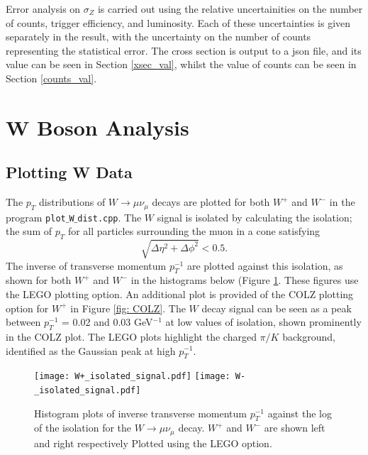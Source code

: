 \documentclass[a4paper]{article}
\begin{document}
Error analysis on $\sigma_Z$ is carried out using the relative uncertainities on the number of counts, trigger efficiency, and luminosity. Each of these uncertainties is given separately in the result, with the uncertainty on the number of counts representing the statistical error. The cross section is output to a json file, and its value can be seen in Section \ref{xsec_val}, whilst the value of counts can be seen in Section \ref{counts_val}.


\section{W Boson Analysis} \label{sec: W boson}

\subsection{Plotting W Data} \label{sec: W plotting}

The $p_T$ distributions of $W \xrightarrow{} \mu \nu_\mu$ decays are plotted for both $W^+$ and $W^-$ in the program \texttt{plot$\_$W$\_$dist.cpp}. 
The $W$ signal is isolated by calculating the isolation; the sum of $p_T$ for all particles surrounding the muon in a cone satisfying
\begin{equation}
    \sqrt{\Delta\eta^2 + \Delta\phi^2} < 0.5.
    \label{eq: isolation}
\end{equation}
The inverse of transverse momentum $p_T^{-1}$ are plotted against this isolation, as shown for both $W^+$ and $W^-$ in the histograms below (Figure \ref{fig: LEGO}. These figures use the LEGO plotting option. An additional plot is provided of the COLZ plotting option for $W^+$ in Figure \ref{fig: COLZ}. %
The $W$ decay signal can be seen as a peak between $p_T^{-1}$ = 0.02 and 0.03 GeV$^{-1}$ at low values of isolation, shown prominently in the COLZ plot. The LEGO plots highlight the charged $\pi/K$ background, identified as the Gaussian peak at high $p_T^{-1}$.


\begin{figure}[t]
\centering
\texttt{[image: W+\_isolated\_signal.pdf]}
\texttt{[image: W-\_isolated\_signal.pdf]} \hspace{3mm}
\vspace{-8mm}
\caption{\small Histogram plots of inverse transverse momentum $p_T^{-1}$ against the log of the isolation for the $W \xrightarrow{} \mu \nu_\mu$ decay. $W^+$ and $W^-$ are shown left and right respectively Plotted using the LEGO option.}
\label{fig: LEGO}
\end{figure}
\end{document}
